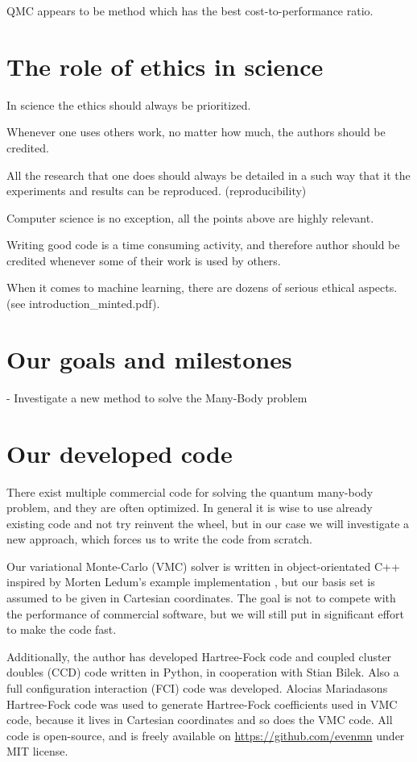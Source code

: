 QMC appears to be method which has the best cost-to-performance ratio.

\section{The role of ethics in science}
In science the ethics should always be prioritized. 

Whenever one uses others work, no matter how much, the authors should be credited. 

All the research that one does should always be detailed in a such way that it the experiments and results can be reproduced. (reproducibility) 

Computer science is no exception, all the points above are highly relevant.  

Writing good code is a time consuming activity, and therefore author should be credited whenever some of their work is used by others. 

When it comes to machine learning, there are dozens of serious ethical aspects. (see introduction\_minted.pdf).

\section{Our goals and milestones} \label{subsec:goals}
- Investigate a new method to solve the Many-Body problem

\section{Our developed code}
There exist multiple commercial code for solving the quantum many-body problem, and they are often optimized. In general it is wise to use already existing code and not try reinvent the wheel, but in our case we will investigate a new approach, which forces us to write the code from scratch.

Our variational Monte-Carlo (VMC) solver is written in object-orientated C++ inspired by Morten Ledum's example implementation \cite{ledum_simple_2016}, but our basis set is assumed to be given in Cartesian coordinates. The goal is not to compete with the performance of commercial software, but we will still put in significant effort to make the code fast.  

Additionally, the author has developed Hartree-Fock code and coupled cluster doubles (CCD) code written in Python, in cooperation with Stian Bilek. Also a full configuration interaction (FCI) code was developed. Alocias Mariadasons Hartree-Fock code was used to generate Hartree-Fock coefficients used in VMC code, because it lives in Cartesian coordinates and so does the VMC code. All code is open-source, and is freely available on \url{https://github.com/evenmn} under MIT license. 

